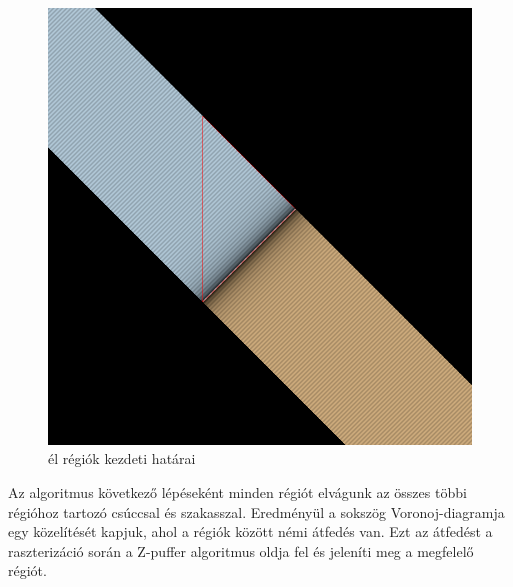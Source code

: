 \begin{figure}[H]
    \centering
    \includegraphics[width=.6\linewidth]{images/initial_segment_regions.png}
    \caption{él régiók kezdeti határai}
    \label{fig:initial_segment_regions-1}
\end{figure}

Az algoritmus következő lépéseként minden régiót elvágunk az összes többi régióhoz tartozó csúccsal és szakasszal. Eredményül a sokszög Voronoj-diagramja egy közelítését kapjuk, ahol a régiók között némi átfedés van. Ezt az átfedést a raszterizáció során a Z-puffer algoritmus oldja fel és jeleníti meg a megfelelő régiót.

